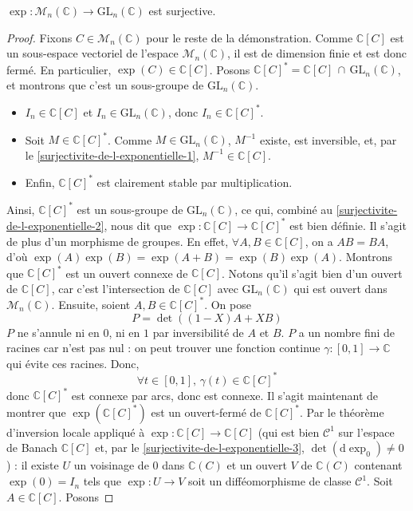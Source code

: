   \begin{theorem}
    \label{surjectivite-de-l-exponentielle-4}
    $\exp : \mathcal{M}_n(\mathbb{C}) \rightarrow \mathrm{GL}_n(\mathbb{C})$ est surjective.
  \end{theorem}

  \begin{proof}
    Fixons $C \in \mathcal{M}_n(\mathbb{C})$ pour le reste de la démonstration. Comme $\mathbb{C}[C]$ est un sous-espace vectoriel de l'espace $\mathcal{M}_n(\mathbb{C})$, il est de dimension finie et est donc fermé. En particulier, $\exp(C) \in \mathbb{C}[C]$.
    \newpar
    Posons $\mathbb{C}[C]^* = \mathbb{C}[C] \, \cap \, \mathrm{GL}_n(\mathbb{C})$, et montrons que c'est un sous-groupe de $\mathrm{GL}_n(\mathbb{C})$.
    \begin{itemize}
      \item $I_n \in \mathbb{C}[C]$ et $I_n \in \mathrm{GL}_n(\mathbb{C})$, donc $I_n \in \mathbb{C}[C]^*$.
      \item Soit $M \in \mathbb{C}[C]^*$. Comme $M \in \mathrm{GL}_n(\mathbb{C})$, $M^{-1}$ existe, est inversible, et, par le \cref{surjectivite-de-l-exponentielle-1}, $M^{-1} \in \mathbb{C}[C]$.
      \item Enfin, $\mathbb{C}[C]^*$ est clairement stable par multiplication.
    \end{itemize}
    Ainsi, $\mathbb{C}[C]^*$ est un sous-groupe de $\mathrm{GL}_n(\mathbb{C})$, ce qui, combiné au \cref{surjectivite-de-l-exponentielle-2}, nous dit que $\exp : \mathbb{C}[C] \rightarrow \mathbb{C}[C]^*$ est bien définie. Il s'agit de plus d'un morphisme de groupes. En effet, $\forall A, B \in \mathbb{C}[C]$, on a $AB=BA$, d'où $\exp(A)\exp(B) = \exp(A+B) = \exp(B)\exp(A)$.
    \newpar
    Montrons que $\mathbb{C}[C]^*$ est un ouvert connexe de $\mathbb{C}[C]$. Notons qu'il s'agit bien d'un ouvert de $\mathbb{C}[C]$, car c'est l'intersection de $\mathbb{C}[C]$ avec $\mathrm{GL}_n(\mathbb{C})$ qui est ouvert dans $\mathcal{M}_n(\mathbb{C})$. Ensuite, soient $A, B \in \mathbb{C}[C]^*$. On pose
    \[ P = \det((1-X)A+XB) \]
    $P$ ne s'annule ni en $0$, ni en $1$ par inversibilité de $A$ et $B$. $P$ a un nombre fini de racines car n'est pas nul : on peut trouver une fonction continue $\gamma : [0,1] \rightarrow \mathbb{C}$ qui évite ces racines. Donc,
    \[ \forall t \in [0,1], \, \gamma(t) \in \mathbb{C}[C]^* \]
    donc $\mathbb{C}[C]^*$ est connexe par arcs, donc est connexe.
    \newpar
    Il s'agit maintenant de montrer que $\exp(\mathbb{C}[C]^*)$ est un ouvert-fermé de $\mathbb{C}[C]^*$. Par le théorème d'inversion locale appliqué à $\exp : \mathbb{C}[C] \rightarrow \mathbb{C}[C]$ (qui est bien $\mathcal{C}^1$ sur l'espace de Banach $\mathbb{C}[C]$ et, par le \cref{surjectivite-de-l-exponentielle-3}, $\det(\mathrm{d}\exp_0) \neq 0$) : il existe $U$ un voisinage de $0$ dans $\mathbb{C}(C)$ et un ouvert $V$ de $\mathbb{C}(C)$ contenant $\exp(0) = I_n$ tels que $\exp : U \rightarrow V$ soit un difféomorphisme de classe $\mathcal{C}^1$. Soit $A \in \mathbb{C}[C]$. Posons

\end{proof}
